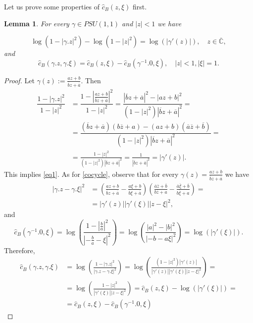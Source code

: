 \documentclass[11pt]{article}
\newtheorem{lemma}{Lemma}[section]
\begin{document}
Let us prove some properties of $\hat{c}_B(z, \xi)$ first.

\begin{lemma}
	For every $\gamma \in PSU(1,1)$ and $|z| < 1$ we have
	
	\begin{equation}
		\label{eq1}
		\log(1 - |\gamma.z|^2) - \log(1 - |z|^2) = \log(|\gamma'(z)|), \quad z \in \overline{\mathbb{C}},
	\end{equation}
 	and
	\begin{equation}
		\label{cocycle}
		\hat{c}_B(\gamma.z, \gamma.\xi) = \hat{c}_B(z, \xi) - \hat{c}_B(\gamma^{-1}.0, \xi), \quad |z| < 1, |\xi| = 1.
	\end{equation}
\end{lemma}

\begin{proof}
Let $\gamma(z) := \frac{a z + b}{\overline{b} z + \overline{a}}$. Then
\[
\begin{aligned}
	\dfrac{1 - |\gamma.z|^2}{1 - |z|^2} &= \dfrac{1 - \left| \frac{az + b}{\overline{b} z + \overline{a}} \right|^2 }{1 - |z|^2} = \dfrac{|\overline{b} z + \overline{a}|^2 - \left| az + b \right|^2 }{(1 - |z|^2) |\overline{b} z + \overline{a}|^2} = \\
	&= \dfrac{(\overline{b} z + \overline{a})(b \overline{z} + a) - (az + b)(\overline{a} \overline{z} + \overline{b}) }{(1 - |z|^2) |\overline{b} z + \overline{a}|^2} = \\ 
	&= \frac{1 - |z|^2}{(1 - |z|^2) |\overline{b} z + \overline{a}|^2} = \frac{1}{|\overline{b} z + \overline{a}|^2} = |\gamma'(z)|.
\end{aligned}
\]
This implies \eqref{eq1}. As for \eqref{cocycle}, observe that for every $\gamma(z) = \frac{az + b}{\overline{b} z + \overline{a}}$ we have
\[
\begin{aligned}
	|\gamma.z - \gamma.\xi|^2 &=  \left( \frac{az + b}{\overline{b} z + \overline{a}} - \frac{a \xi + b}{\overline{b} \xi + \overline{a}}\right) \left( \frac{\overline{a}\overline{z} + \overline{b}}{b \overline{z} + a} - \frac{\overline{a}\overline{\xi} + \overline{b}}{b \overline{\xi} + a} \right) = \\ 
	&= |\gamma'(z)| |\gamma'(\xi)| |z - \xi|^2,
\end{aligned}
\]
and
\[
\hat{c}_B(\gamma^{-1}.0, \xi) = \log \left( \frac{1 - |\frac{b}{a}|^2}{|-\frac{b}{a} - \xi|^2} \right) = \log \left( \frac{|a|^2 - |b|^2}{|-b - a\xi|^2} \right) = \log(|\gamma'(\xi)|).
\]
Therefore,
\[
\begin{aligned}
	\hat{c}_B(\gamma.z, \gamma.\xi) &= \log\left( \frac{1- |\gamma.z|^2}{|\gamma.z - \gamma.\xi|^2} \right) = \log\left( \frac{(1- |z|^2) |\gamma'(z)|}{|\gamma'(z)| |\gamma'(\xi)| |z - \xi|^2} \right) = \\ &= \log \left( \frac{1 - |z|^2}{|\gamma'(\xi)| |z - \xi|^2} \right) = \hat{c}_B(z, \xi) - \log(|\gamma'(\xi)|) = \\ &= \hat{c}_B(z, \xi) - \hat{c}_B(\gamma^{-1}.0, \xi)
\end{aligned}
\]
\end{proof}
\end{document}
